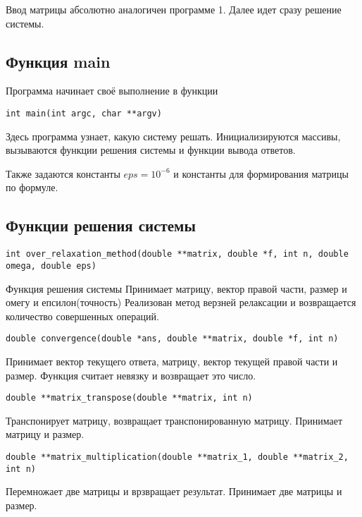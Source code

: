 \documentclass[a4paper,12pt,titlepage,finall]{article}
\begin{document}
Ввод матрицы абсолютно аналогичен программе 1. Далее идет сразу решение системы.

\subsection{Функция main}
Программа начинает своё выполнение в функции
\begin{verbatim}
int main(int argc, char **argv)
\end{verbatim}

Здесь программа узнает, какую систему решать. Инициализируются массивы, вызываются функции решения системы и функции вывода ответов.

Также задаются константы $eps = 10^{-6}$ и константы для формирования матрицы по формуле.


\subsection{Функции решения системы}

\begin{verbatim}
int over_relaxation_method(double **matrix, double *f, int n, double omega, double eps)
\end{verbatim}

Функция решения системы
Принимает матрицу, вектор правой части, размер и омегу и епсилон(точность)
Реализован метод верзней релаксации и возвращается количество совершенных операций.

\begin{verbatim}
double convergence(double *ans, double **matrix, double *f, int n)
\end{verbatim}

Принимает вектор текущего ответа, матрицу, вектор текущей правой части и размер.
Функция считает невязку и возвращает это число.

\begin{verbatim}
double **matrix_transpose(double **matrix, int n)
\end{verbatim}

Транспонирует матрицу, возвращает транспонированную матрицу. Принимает матрицу и размер.

\begin{verbatim}
double **matrix_multiplication(double **matrix_1, double **matrix_2, int n)
\end{verbatim}

Перемножает две матрицы и врзвращает результат. Принимает две матрицы и размер.
\end{document}
